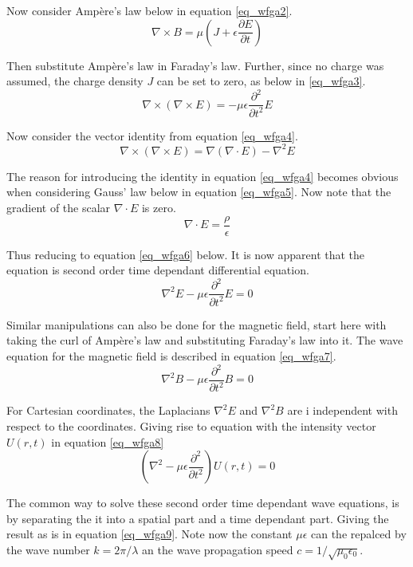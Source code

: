 \documentclass{article}
\begin{document}
Now consider Amp\`{e}re's law below in equation \ref{eq_wfga2}.
\begin{equation}
\label{eq_wfga2}
\nabla \times B = \mu \left( J + \epsilon \frac{\partial E}{\partial t} \right)
\end{equation}

Then substitute Amp\`{e}re's law in Faraday's law. Further, since no charge was assumed, the charge density $J$ can be set to zero, as below in \ref{eq_wfga3}.
\begin{equation}
\label{eq_wfga3}
\nabla \times (\nabla \times E) = -\mu \epsilon \frac{\partial^2}{\partial t^2} E
\end{equation}

Now consider the vector identity from equation \ref{eq_wfga4}.
\begin{equation}
\label{eq_wfga4}
\nabla \times (\nabla \times E) = \nabla(\nabla \cdot E) - \nabla^2 E
\end{equation}

The reason for introducing the identity in equation \ref{eq_wfga4} becomes obvious when considering Gauss' law below in equation \ref{eq_wfga5}. Now note that the gradient of the scalar $\nabla \cdot E$ is zero.
\begin{equation}
\label{eq_wfga5}
\nabla \cdot E = \frac{\rho}{\epsilon}
\end{equation}

Thus reducing to equation \ref{eq_wfga6} below. It is now apparent that the equation is second order time dependant differential equation.
\begin{equation}
\label{eq_wfga6}
\nabla^2 E - \mu \epsilon \frac{\partial^2}{\partial t^2} E = 0 
\end{equation}

Similar manipulations can also be done for the magnetic field, start here with taking the curl of Amp\`{e}re's law and substituting Faraday's law into it. The wave equation for the magnetic field is described in equation \ref{eq_wfga7}.
\begin{equation}
\label{eq_wfga7}
\nabla^2 B - \mu \epsilon \frac{\partial^2}{\partial t^2} B = 0 
\end{equation}

For Cartesian coordinates, the Laplacians $\nabla^2 E$ and $\nabla^2 B$ are i independent with respect to the coordinates. Giving rise to equation with the intensity vector $U(r,t)$ in equation \ref{eq_wfga8}
\begin{equation}
\label{eq_wfga8}
\left( \nabla^2 - \mu \epsilon \frac{\partial^2}{\partial t^2} \right) U(r,t)= 0 
\end{equation}

The common way to solve these second order time dependant wave equations, is by separating the it into a spatial part and a time dependant part. Giving the result as is in equation \ref{eq_wfga9}. Note now the constant $\mu \epsilon$ can the repalced by the wave number $k = 2\pi/\lambda $ an the wave propagation speed $c = 1/\sqrt{\mu_0 \epsilon_0}$.
\begin{equation}
\label{eq_wfga9}
\end{equation}

\newpage


\end{document}
